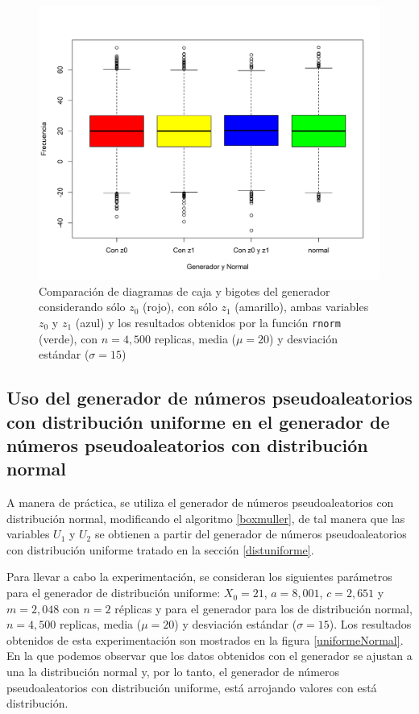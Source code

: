 \documentclass{article}
\begin{document}
\begin{figure}
\centering
\includegraphics[width=\linewidth]{Figures/comparativosZ.png}
\caption{Comparación de diagramas de caja y bigotes del generador considerando sólo $z_{0}$ (rojo), con sólo $z_{1}$ (amarillo), ambas variables $z_{0}$ y $z_{1}$ (azul) y los resultados obtenidos por la función \texttt{rnorm} (verde), con $n= 4,500$ replicas, media ($\mu = 20$) y desviación estándar ($\sigma = 15$)}
\label{escenario2-3}
\end{figure}

\subsection{Uso del generador de números pseudoaleatorios con distribución uniforme en el generador de números pseudoaleatorios con distribución normal}

A manera de práctica, se utiliza el generador de números pseudoaleatorios con distribución normal, modificando el algoritmo \ref{boxmuller}, de tal manera que las variables $U_{1}$ y $U_{2}$ se obtienen a partir del generador de números pseudoaleatorios con distribución uniforme tratado en la sección \ref{distuniforme}. 

Para llevar a cabo la experimentación, se consideran los siguientes parámetros para el generador de distribución uniforme: $X_{0}=21$, $a = 8,001$, $c = 2,651$ y $m = 2,048$ con $n=2$ réplicas y para el generador para los de distribución normal, $n= 4,500$ replicas, media ($\mu = 20$) y desviación estándar ($\sigma = 15$). Los resultados obtenidos de esta experimentación son mostrados en la figura \ref{uniformeNormal}. En la que podemos observar que los datos obtenidos con el generador se ajustan a una la distribución normal y, por lo tanto, el generador de números pseudoaleatorios con distribución uniforme, está arrojando valores con está distribución.
\end{document}
